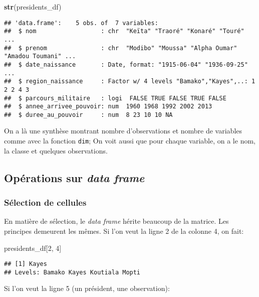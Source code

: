 \documentclass[]{book}
\newenvironment{Shaded}{\begin{snugshade}}{\end{snugshade}}
\newcommand{\KeywordTok}[1]{\textcolor[rgb]{0.13,0.29,0.53}{\textbf{#1}}}
\newcommand{\DecValTok}[1]{\textcolor[rgb]{0.00,0.00,0.81}{#1}}
\newcommand{\NormalTok}[1]{#1}
\begin{document}
\begin{Shaded}
\begin{Highlighting}[]
\KeywordTok{str}\NormalTok{(presidents_df)}
\end{Highlighting}
\end{Shaded}

\begin{verbatim}
## 'data.frame':    5 obs. of  7 variables:
##  $ nom                  : chr  "Keïta" "Traoré" "Konaré" "Touré" ...
##  $ prenom               : chr  "Modibo" "Moussa" "Alpha Oumar" "Amadou Toumani" ...
##  $ date_naissance       : Date, format: "1915-06-04" "1936-09-25" ...
##  $ region_naissance     : Factor w/ 4 levels "Bamako","Kayes",..: 1 2 2 4 3
##  $ parcours_militaire   : logi  FALSE TRUE FALSE TRUE FALSE
##  $ annee_arrivee_pouvoir: num  1960 1968 1992 2002 2013
##  $ duree_au_pouvoir     : num  8 23 10 10 NA
\end{verbatim}

On a là une synthèse montrant nombre d'observations et nombre de
variables comme avec la fonction \texttt{dim}; On voit aussi que pour
chaque variable, on a le nom, la classe et quelques observations.

\subsection{\texorpdfstring{Opérations sur \emph{data
frame}}{Opérations sur data frame}}\label{operations-sur-data-frame}

\subsubsection{Sélection de cellules}\label{selection-de-cellules}

En matière de sélection, le \emph{data frame} hérite beaucoup de la
matrice. Les principes demeurent les mêmes. Si l'on veut la ligne 2 de
la colonne 4, on fait:

\begin{Shaded}
\begin{Highlighting}[]
\NormalTok{presidents_df[}\DecValTok{2}\NormalTok{, }\DecValTok{4}\NormalTok{]}
\end{Highlighting}
\end{Shaded}

\begin{verbatim}
## [1] Kayes
## Levels: Bamako Kayes Koutiala Mopti
\end{verbatim}

Si l'on veut la ligne 5 (un président, une observation):
\end{document}
